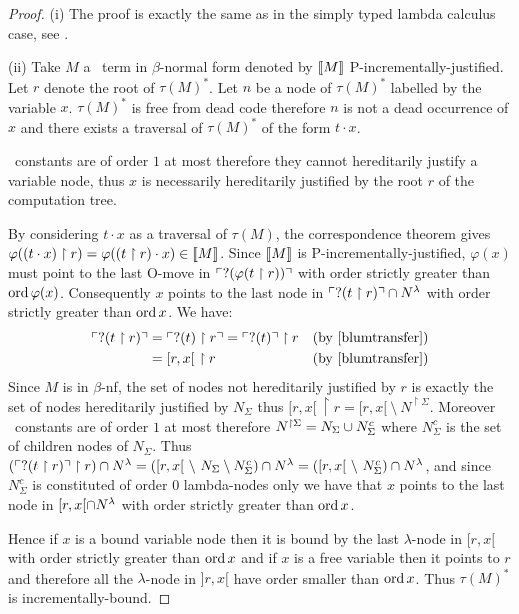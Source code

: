 \begin{proof}
(i) The proof is exactly the same as in the simply typed lambda calculus case,
see \cite[Proposition 4.1.5(i)]{blumtransfer}.

\noindent (ii)
Take $M$ a \pcf\ term in $\beta$-normal form denoted by ${[\![ M ]\!]}$ P-incrementally-justified. Let $r$ denote the root of $\tau(M)^*$.
Let $n$ be a node of $\tau(M)^*$ labelled by the variable $x$.
$\tau(M)^*$ is free from dead code therefore $n$ is not a dead occurrence of $x$ and there exists a traversal of $\tau(M)^*$ of the form $t \cdot x$.

\pcf\ constants are of order $1$ at most therefore they cannot hereditarily justify a variable node, thus $x$ is necessarily hereditarily justified by the root $r$ of the computation tree.


By considering $t\cdot x$ as a traversal of $\tau(M)$,  the correspondence theorem gives $\varphi((t \cdot x) \upharpoonright r) = \varphi((t \upharpoonright r) \cdot x) \in {[\![ M ]\!]}$. Since ${[\![ M ]\!]}$ is P-incrementally-justified, $\varphi(x)$ must point to the last O-move in $\ulcorner ?(\varphi(t \upharpoonright
r)) \urcorner$ with order strictly greater than $\mathop{\mathrm{ord}}{\varphi(x)}$.
Consequently $x$ points to the last node in $\ulcorner ?(t
\upharpoonright r) \urcorner \cap N^{\lambda}$ with order strictly greater than $\mathop{\mathrm{ord}}{x}$. We have:
\begin{align*}
\pview{?(t \upharpoonright r)} &= \pview{?(t) \upharpoonright r} = \pview{?(t)} \upharpoonright r & (\mbox{by \cite[lemma 3.1.23]{blumtransfer}}) \\
& = [r,x[ \ \upharpoonright r & (\mbox{by \cite[proposition 3.1.20]{blumtransfer}})
\end{align*}
Since $M$ is in $\beta$-nf, the set of nodes not hereditarily justified by $r$ is exactly the set of nodes hereditarily justified by $N_{\Sigma}$ thus
$[r,x[ \ \upharpoonright r = [r,x[\ \setminus\  N^{\upharpoonright \Sigma}$.
Moreover \pcf\ constants are of order $1$ at most therefore $N^{\upharpoonright \Sigma} = N_{\Sigma} \cup N^c_{\Sigma}$
where $N^c_{\Sigma}$ is the set of children nodes of $N_{\Sigma}$.
Thus $(\ulcorner ?(t \upharpoonright r) \urcorner\upharpoonright r) \cap N^{\lambda} =
([r,x[\ \setminus\  N_{\Sigma} \setminus N^c_{\Sigma} ) \cap N^{\lambda} =
([r,x[\ \setminus\  N^c_{\Sigma} )  \cap N^{\lambda}$, and
since $N^c_{\Sigma}$ is constituted of order $0$ lambda-nodes only we have that
$x$ points to the last node in $[r,x[ \cap N^{\lambda}$ with order strictly greater than $\mathop{\mathrm{ord}}{x}$.

Hence if $x$ is a bound variable node then it is bound by the
last $\lambda$-node in $[r,x[$ with order strictly greater than
$\mathop{\mathrm{ord}}{x}$ and if $x$ is a free variable then it points to $r$ and
therefore all the $\lambda$-node in $]r,x[$ have order smaller than
$\mathop{\mathrm{ord}}{x}$. Thus $\tau(M)^*$ is incrementally-bound.

\end{proof}

